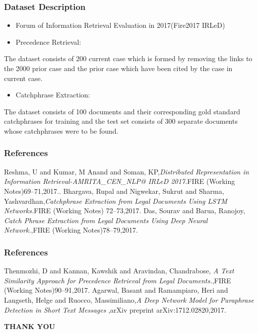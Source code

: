 \documentclass{beamer}
\begin{document}
\begin{frame}\frametitle{Dataset Description}
	\begin{itemize}
		\item  Forum of Information Retrieval Evaluation
in 2017(Fire2017  IRLeD)
	\end{itemize}
\begin{itemize}
 \item Precedence Retrieval:
\end{itemize}
		\begin{itemize}
			  The dataset consists of 200 current case which is formed by removing the links to the 2000 prior case and the prior case which have been cited by the case in current case.
		\end{itemize}
\begin{itemize}
 \item Catchphrase Extraction:
\end{itemize}
	\begin{itemize}
The dataset consists of 100 documents and their corresponding gold standard catchphrases for training and the test set consists of 300 separate documents whose catchphrases were to be found.
	\end{itemize}
\end{frame}



\begin{frame}\frametitle{References}
\begin{thebibliography}{99}
    
	Reshma, U and Kumar, M Anand and Soman, KP,{\em Distributed Representation in Information Retrieval-AMRITA\_CEN\_NLP@ IRLeD 2017.}FIRE (Working Notes)69--71,2017..
	Bhargava, Rupal and Nigwekar, Sukrut and Sharma, Yashvardhan,{\em Catchphrase Extraction from Legal Documents Using LSTM Networks.}FIRE (Working Notes) 72--73,2017.
	Das, Sourav and Barua, Ranojoy, {\em Catch Phrase Extraction from Legal Documents Using Deep Neural Network.},FIRE (Working Notes)78--79,2017.
\end{thebibliography}
\end{frame}
	
\begin{frame}\frametitle{References}
	\begin{thebibliography}{99}	
	 Thenmozhi, D and Kannan, Kawshik and Aravindan, Chandrabose, {\em A Text Similarity Approach for Precedence Retrieval from Legal Documents.},FIRE (Working Notes)90--91,2017.
	Agarwal, Basant and Ramampiaro, Heri and Langseth, Helge and Ruocco, Massimiliano,{\em A Deep Network Model for Paraphrase Detection in Short Text Messages} ,arXiv preprint arXiv:1712.02820,2017.
\end{thebibliography}
\end{frame}

\begin{frame}
    \begin{LARGE}
    \begin{Huge}
    \begin{center}
        \textbf{THANK YOU}
    \end{center}  
    \end{Huge}  
    \end{LARGE}
  
  
\end{frame}
\end{document}
